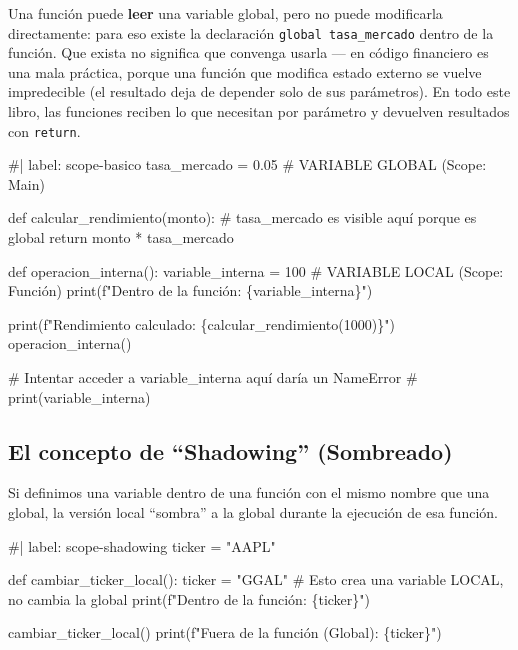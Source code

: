\documentclass[
  spanish,
  letterpaper,
  DIV=11,
  numbers=noendperiod]{scrreprt}
\newenvironment{Shaded}{\begin{snugshade}}{\end{snugshade}}
\newcommand{\NormalTok}[1]{\textcolor[rgb]{0.00,0.23,0.31}{#1}}
\begin{document}
Una función puede \textbf{leer} una variable global, pero no puede
modificarla directamente: para eso existe la declaración
\texttt{global\ tasa\_mercado} dentro de la función. Que exista no
significa que convenga usarla --- en código financiero es una mala
práctica, porque una función que modifica estado externo se vuelve
impredecible (el resultado deja de depender solo de sus parámetros). En
todo este libro, las funciones reciben lo que necesitan por parámetro y
devuelven resultados con \texttt{return}.

\begin{Shaded}
\begin{Highlighting}[]
\NormalTok{\#| label: scope{-}basico}
\NormalTok{tasa\_mercado = 0.05  \# VARIABLE GLOBAL (Scope: Main)}

\NormalTok{def calcular\_rendimiento(monto):}
\NormalTok{    \# tasa\_mercado es visible aquí porque es global}
\NormalTok{    return monto * tasa\_mercado}

\NormalTok{def operacion\_interna():}
\NormalTok{    variable\_interna = 100  \# VARIABLE LOCAL (Scope: Función)}
\NormalTok{    print(f"Dentro de la función: \{variable\_interna\}")}

\NormalTok{print(f"Rendimiento calculado: \{calcular\_rendimiento(1000)\}")}
\NormalTok{operacion\_interna()}

\NormalTok{\# Intentar acceder a variable\_interna aquí daría un NameError}
\NormalTok{\# print(variable\_interna) }
\end{Highlighting}
\end{Shaded}

\subsection{El concepto de ``Shadowing''
(Sombreado)}\label{el-concepto-de-shadowing-sombreado}

Si definimos una variable dentro de una función con el mismo nombre que
una global, la versión local ``sombra'' a la global durante la ejecución
de esa función.

\begin{Shaded}
\begin{Highlighting}[]
\NormalTok{\#| label: scope{-}shadowing}
\NormalTok{ticker = "AAPL"}

\NormalTok{def cambiar\_ticker\_local():}
\NormalTok{    ticker = "GGAL"  \# Esto crea una variable LOCAL, no cambia la global}
\NormalTok{    print(f"Dentro de la función: \{ticker\}")}

\NormalTok{cambiar\_ticker\_local()}
\NormalTok{print(f"Fuera de la función (Global): \{ticker\}")}
\end{Highlighting}
\end{Shaded}
\end{document}
